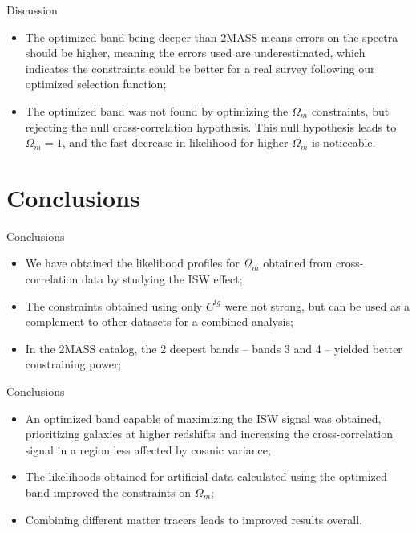 \documentclass[serif, aspectratio=169]{beamer}
\begin{document}
\begin{frame}{Discussion}
    \begin{itemize}
        \item The optimized band being deeper than 2MASS means errors on the spectra should be higher, meaning the errors used are underestimated, which indicates the constraints could be better for a real survey following our optimized selection function;
        \item The optimized band was not found by optimizing the $\Omega_m$ constraints, but rejecting the null cross-correlation hypothesis. This null hypothesis leads to $\Omega_m=1$, and the fast decrease in likelihood for higher $\Omega_m$ is noticeable.
    \end{itemize}
\end{frame}

\section{Conclusions}

\begin{frame}{Conclusions}
    \begin{itemize}
        \item We have obtained the likelihood profiles for $\Omega_m$ obtained from cross-correlation data by studying the ISW effect;
        \item The constraints obtained using only $C^{tg}$ were not strong, but can be used as a complement to other datasets for a combined analysis;
        \item In the 2MASS catalog, the 2 deepest bands -- bands 3 and 4 -- yielded better constraining power;
    \end{itemize}
\end{frame}
\begin{frame}{Conclusions}
    \begin{itemize}
        \item An optimized band capable of maximizing the ISW signal was obtained, prioritizing galaxies at higher redshifts and increasing the cross-correlation signal in a region less affected by cosmic variance;
        \item The likelihoods obtained for artificial data calculated using the optimized band improved the constraints on $\Omega_m$;
        \item Combining different matter tracers leads to improved results overall.
    \end{itemize}
\end{frame}
\end{document}
